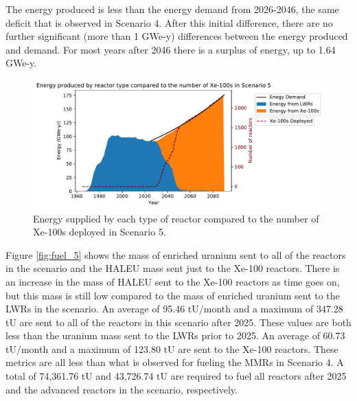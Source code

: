 The energy produced is less than the energy demand from 
2026-2046, the same deficit that is observed in Scenario 4. After this 
initial difference, there are no further significant (more than 
1 GWe-y) differences between 
the energy produced and demand. For most years after 2046 there 
is a surplus of energy, up to 1.64 GWe-y. 

\begin{figure}
    \centering 
    \includegraphics[width=\textwidth]{../figures/energy_scenario5.pdf}
    \caption{Energy supplied by each type of reactor compared to the number of 
    Xe-100s deployed in Scenario 5.}
    \label{fig:energy_rx_5}
\end{figure}

Figure \ref{fig:fuel_5} shows the mass of enriched uranium sent to all of 
the reactors in the scenario and the \gls{HALEU} mass sent just to the 
Xe-100 reactors. There is an increase in the mass of \gls{HALEU} sent 
to the Xe-100 reactors as time goes on, but this mass is still  
low compared to the mass of enriched uranium sent to the \glspl{LWR} in 
the scenario. An average of 95.46 tU/month and a maximum of 347.28 tU 
are sent to all of the reactors in this scenario after 2025. These 
values are both less than the uranium mass sent to the 
\glspl{LWR} prior to 2025. An average of 
60.73 tU/month and a maximum of 123.80 tU are sent to the Xe-100 reactors. 
These metrics are all less than what is observed 
for fueling the \glspl{MMR} in Scenario 4. A total of 74,361.76 tU and 
43,726.74 tU are required to fuel all reactors after 2025 and the advanced reactors 
in the scenario, respectively.


